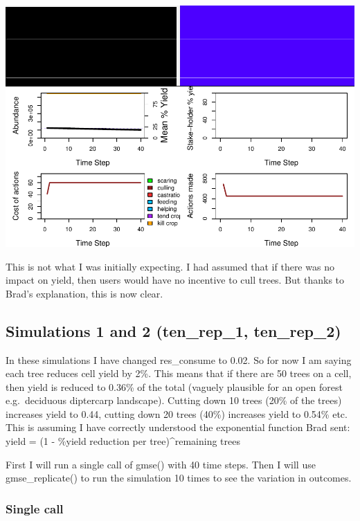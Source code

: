 \documentclass[
]{article}
\begin{document}
\includegraphics{gmse_tenure_ongoing_files/figure-latex/ten_rep_0_plot-1.pdf}

This is not what I was initially expecting. I had assumed that if there
was no impact on yield, then users would have no incentive to cull
trees. But thanks to Brad's explanation, this is now clear.

\hypertarget{simulations-1-and-2-ten_rep_1-ten_rep_2}{%
\subsection{Simulations 1 and 2 (ten\_rep\_1,
ten\_rep\_2)}\label{simulations-1-and-2-ten_rep_1-ten_rep_2}}

In these simulations I have changed res\_consume to 0.02. So for now I
am saying each tree reduces cell yield by 2\%. This means that if there
are 50 trees on a cell, then yield is reduced to 0.36\% of the total
(vaguely plausible for an open forest e.g.~deciduous diptercarp
landscape). Cutting down 10 trees (20\% of the trees) increases yield to
0.44, cutting down 20 trees (40\%) increases yield to 0.54\% etc. This
is assuming I have correctly understood the exponential function Brad
sent: yield = (1 - \%yield reduction per tree)\^{}remaining trees

First I will run a single call of gmse() with 40 time steps. Then I will
use gmse\_replicate() to run the simulation 10 times to see the
variation in outcomes.

\hypertarget{single-call}{%
\subsubsection{Single call}\label{single-call}}
\end{document}
